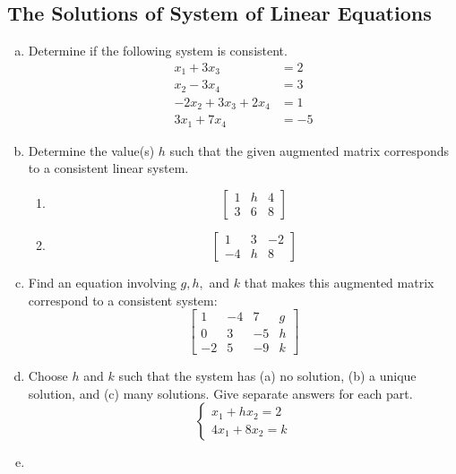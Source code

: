 \subsection{The Solutions of System of Linear Equations}
\begin{enumerate}[(a)]
    \item Determine if the following system is consistent.
    $$
    \begin{aligned}
        x_{1}+3 x_{3}&=2 \\
        x_{2}-3 x_{4}&=3 \\
        -2 x_{2}+3 x_{3}+2 x_{4}&=1 \\
        3 x_{1}+7 x_{4}&=-5
    \end{aligned}
    $$
    \item Determine the value(s) $h$ such that the given augmented matrix corresponds to a consistent linear system.
    \begin{enumerate}[i]
        \item 
        $$
        \left[\begin{array}{rr|r}
        1 & h & 4 \\
        3 & 6 & 8
        \end{array}\right]
        $$
        \item
        $$
        \left[\begin{array}{rr|r}
        1 & 3 & -2 \\
        -4 & h & 8
        \end{array}\right]
        $$
    \end{enumerate}
    \item
    Find an equation involving $g, h,$ and $k$ that makes this augmented matrix correspond to a consistent system:
    $$\left[\begin{array}{rrr|r}1 & -4 & 7 & g \\ 0 & 3 & -5 & h \\ -2 & 5 & -9 & k\end{array}\right]$$
    \item
    Choose $h$ and $k$ such that the system has (a) no solution, (b) a unique solution, and (c) many solutions. Give separate answers for each part.
    \begin{equation*}
        \begin{cases}
        x_{1}+h x_{2}=2\\
        4 x_{1}+8 x_{2}=k
        \end{cases}
    \end{equation*}
    \item

\end{enumerate}
